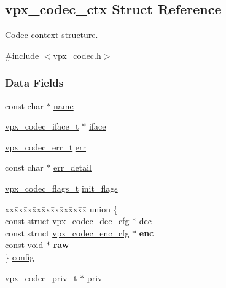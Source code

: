 \hypertarget{structvpx__codec__ctx}{}\subsection{vpx\+\_\+codec\+\_\+ctx Struct Reference}
\label{structvpx__codec__ctx}


Codec context structure.  




{\ttfamily \#include $<$vpx\+\_\+codec.\+h$>$}

\subsubsection*{Data Fields}
\begin{DoxyCompactItemize}
\item 
const char $\ast$ \hyperlink{structvpx__codec__ctx_a7ed1bf8f6434ea2df01da8011849c6cb}{name}
\item 
\hyperlink{group__codec_gae99c3b04f4a567a311211cce3ae6b83b}{vpx\+\_\+codec\+\_\+iface\+\_\+t} $\ast$ \hyperlink{structvpx__codec__ctx_af5986790e3420beda77f3a9b64f6b953}{iface}
\item 
\hyperlink{group__codec_gada1084710837ad363b92f2379dd2b8d2}{vpx\+\_\+codec\+\_\+err\+\_\+t} \hyperlink{structvpx__codec__ctx_a6f448802b0675013fd8c5179675c30de}{err}
\item 
const char $\ast$ \hyperlink{structvpx__codec__ctx_ad785c88ae862dd9129965c72723260bd}{err\+\_\+detail}
\item 
\hyperlink{group__codec_ga3b36d5af89ddc463489fe5bde0a57877}{vpx\+\_\+codec\+\_\+flags\+\_\+t} \hyperlink{structvpx__codec__ctx_a76546548086c060a6bd21cb55037fb2b}{init\+\_\+flags}
\item 
\begin{tabbing}
xx\=xx\=xx\=xx\=xx\=xx\=xx\=xx\=xx\=\kill
union \{\\
\>const struct \hyperlink{structvpx__codec__dec__cfg}{vpx\_codec\_dec\_cfg} $\ast$ \hyperlink{structvpx__codec__ctx_a3033c08dd62713d56d875ea51575bd2b}{dec}\\
\>const struct \hyperlink{structvpx__codec__enc__cfg}{vpx\_codec\_enc\_cfg} $\ast$ {\bfseries enc}\\
\>const void $\ast$ {\bfseries raw}\\
\} \hyperlink{structvpx__codec__ctx_aaa15a858376e55269a0a7ba5bff09f04}{config}\\

\end{tabbing}\item 
\hyperlink{group__codec_ga1e262f91be9141a7176335fd409397ab}{vpx\+\_\+codec\+\_\+priv\+\_\+t} $\ast$ \hyperlink{structvpx__codec__ctx_acee775fd5b7580e112e245ce39733f92}{priv}
\end{DoxyCompactItemize}


